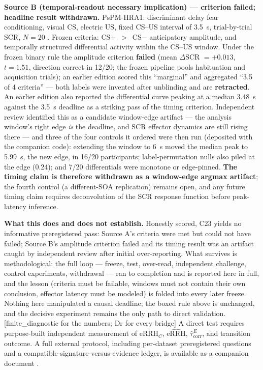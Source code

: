 \documentclass[9pt,twocolumn]{article}
\newcommand{\eRRHc}{\mathrm{eRRH}_{C}}
\newcommand{\eRRHhat}{\widehat{\mathrm{eRRH}}}
\newcommand{\tcorr}{\widehat{\tau}^{E}_{\mathrm{corr}}}
\newcommand{\tier}[1]{{\sffamily\scriptsize\color{RRHMSlate}[#1]}}
\begin{document}
\textbf{Source B (temporal-readout necessary implication) --- criterion failed; headline result withdrawn.} PsPM-HRA1: discriminant delay fear conditioning, visual CS, electric US, fixed CS--US interval of 3.5~s, trial-by-trial SCR, $N{=}20$ \cite{hra1data}. Frozen criteria: CS$+$~$>$~CS$-$ anticipatory amplitude, and temporally structured differential activity within the CS--US window. Under the frozen binary rule the amplitude criterion \textbf{failed} (mean $\Delta$SCR $=+0.013$, $t=1.51$, direction correct in 12/20; the frozen pipeline pools habituation and acquisition trials); an earlier edition scored this ``marginal'' and aggregated ``3.5 of 4 criteria'' --- both labels were invented after unblinding and are \textbf{retracted}. An earlier edition also reported the differential curve peaking at a median 3.48~s against the 3.5~s deadline as a striking pass of the timing criterion. Independent review identified this as a candidate window-edge artifact --- the analysis window's right edge \emph{is} the deadline, and SCR effector dynamics are still rising there --- and three of the four controls it ordered were then run (deposited with the companion code): extending the window to 6~s moved the median peak to 5.99~s, the new edge, in 16/20 participants; label-permutation nulls also piled at the edge (0.24); and 7/20 differentials were monotone or edge-pinned. \textbf{The timing claim is therefore withdrawn as a window-edge argmax artifact}; the fourth control (a different-SOA replication) remains open, and any future timing claim requires deconvolution of the SCR response function before peak-latency inference.

\textbf{What this does and does not establish.} Honestly scored, C23 yields no informative preregistered pass: Source A's criteria were met but could not have failed; Source B's amplitude criterion failed and its timing result was an artifact caught by independent review after initial over-reporting. What survives is methodological: the full loop --- freeze, test, over-read, independent challenge, control experiments, withdrawal --- ran to completion and is reported here in full, and the lesson (criteria must be failable, windows must not contain their own conclusion, effector latency must be modeled) is folded into every later freeze. Nothing here manipulated a causal deadline; the boxed rule above is unchanged, and the decisive experiment remains the only path to direct validation. \tier{finite\_diagnostic for the numbers; Dr for every bridge}
A direct test requires purpose-built independent measurement of $\eRRHc$, $\eRRHhat$, $\tcorr$, and transition outcome. A full external protocol, including per-dataset preregistered questions and a compatible-signature-versus-evidence ledger, is available as a companion document \cite{lahtee2026extprotocol}.
\end{document}

